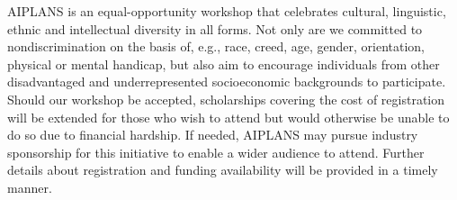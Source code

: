 \documentclass{article}
\begin{document}
    AIPLANS is an equal-opportunity workshop that celebrates cultural, linguistic, ethnic and intellectual diversity in all forms. Not only are we committed to nondiscrimination on the basis of, e.g., race, creed, age, gender, orientation, physical or mental handicap, but also aim to encourage individuals from other disadvantaged and underrepresented socioeconomic backgrounds to participate. Should our workshop be accepted, scholarships covering the cost of registration will be extended for those who wish to attend but would otherwise be unable to do so due to financial hardship. If needed, AIPLANS may pursue industry sponsorship for this initiative to enable a wider audience to attend. Further details about registration and funding availability will be provided in a timely manner.


    \newpage
\end{document}
